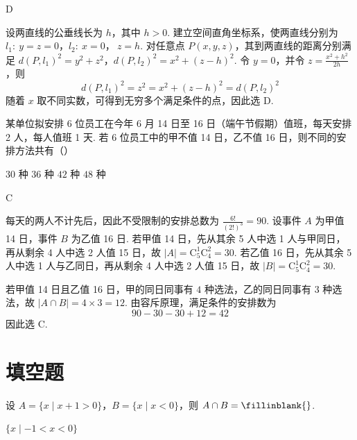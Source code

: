 \begin{answer}
D
\end{answer}

\begin{solution}
设两直线的公垂线长为 \(h\)，其中 \(h>0\). 建立空间直角坐标系，使两直线分别为
\(l_1:\ y=z=0\)，\(l_2:\ x=0\)，\(\ z=h\).
对任意点 \(P(x,y,z)\)，其到两直线的距离分别满足
\(d(P,l_1)^2=y^2+z^2\)，\(d(P,l_2)^2=x^2+(z-h)^2\).
令 \(y=0\)，并令 \(z=\frac{x^2+h^2}{2h}\)，则
\[
d(P,l_1)^2=z^2=x^2+(z-h)^2=d(P,l_2)^2
\]
随着 \(x\) 取不同实数，可得到无穷多个满足条件的点，因此选 D.
\end{solution}

\begin{problem}
某单位拟安排 6 位员工在今年 6 月 14 日至 16 日（端午节假期）值班，每天安排 2 人，每人值班 1 天. 若 6 位员工中的甲不值 14 日，乙不值 16 日，则不同的安排方法共有（\quad）

\choices
    {\(30\text{ 种}\)}
    {\(36\text{ 种}\)}
    {\(42\text{ 种}\)}
    {\(48\text{ 种}\)}
\end{problem}

\begin{answer}
C
\end{answer}

\begin{solution}
每天的两人不计先后，因此不受限制的安排总数为 \(\frac{6!}{(2!)^3}=90\). 设事件 \(A\) 为甲值 14 日，事件 \(B\) 为乙值 16 日. 若甲值 14 日，先从其余 5 人中选 1 人与甲同日，再从剩余 4 人中选 2 人值 15 日，故 \(|A|=\mathrm C_5^1\mathrm C_4^2=30\). 若乙值 16 日，先从其余 5 人中选 1 人与乙同日，再从剩余 4 人中选 2 人值 15 日，故 \(|B|=\mathrm C_5^1\mathrm C_4^2=30\).

若甲值 14 日且乙值 16 日，甲的同日同事有 \(4\) 种选法，乙的同日同事有 \(3\) 种选法，故 \(|A\cap B|=4\times3=12\). 由容斥原理，满足条件的安排数为
\[
90-30-30+12=42
\]
因此选 C.
\end{solution}

\section{填空题}

\begin{problem}
设 \(A = \{x \mid x + 1 > 0\}\)，\(B = \{x \mid x < 0\}\)，则 \(A \cap B =\fillinblank{}\).
\end{problem}

\begin{answer}
\(\{x \mid -1 < x < 0\}\)
\end{answer}

